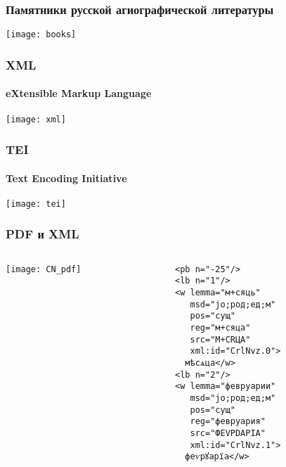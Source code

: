 \begin{frame}
  \frametitle{Памятники русской агиографической литературы}

  \begin{center}
    \texttt{[image: books]}
  \end{center}
\end{frame}

\begin{frame}
  \frametitle{XML}
  \framesubtitle{eXtensible Markup Language}

  \begin{center}
    \texttt{[image: xml]}
  \end{center}
\end{frame}

\begin{frame}
  \frametitle{TEI}
  \framesubtitle{Text Encoding Initiative}

  \begin{center}
    \texttt{[image: tei]}
  \end{center}
\end{frame}

\begin{frame}[fragile]
  \frametitle{PDF и XML}

  \begin{columns}[c]
    \begin{column}{6cm}
      \texttt{[image: CN\_pdf]}
    \end{column}

    \begin{column}{6cm}
      \begin{Verbatim}[fontsize=\footnotesize]
<pb n="-25"/>
<lb n="1"/>
<w lemma="м+сяць"
   msd="jo;род;ед;м"
   pos="сущ"
   reg="м+сяца"
   src="М+СRЦА"
   xml:id="CrlNvz.0">
  мѣсѧца</w>
<lb n="2"/>
<w lemma="февруарии"
   msd="jo;род;ед;м"
   pos="сущ"
   reg="февруария"
   src="ФЕVРDАРIА"
   xml:id="CrlNvz.1">
  феѵрꙋарїа</w>
\end{Verbatim}
    \end{column}
  \end{columns}
\end{frame}

